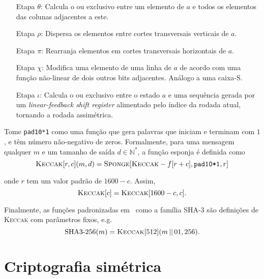 \documentclass[12pt]{report}
\newcommand{\concat}{\, \vert \vert \,}
\begin{document}
\begin{enumerate}

  \item[Etapa $\theta$:] Calcula o ou exclusivo entre um elemento de $a$ e
    todos os elementos das colunas adjacentes a este.

  \item[Etapa $\rho$:] Dispersa os elementos entre cortes transversais
    verticais de $a$.

  \item[Etapa $\pi$:] Rearranja elementos em cortes transversais horizontais de
    $a$.

  \item[Etapa $\chi$:] Modifica uma elemento de uma linha de $a$ de acordo com
    uma função não-linear de dois outros bits adjacentes. Análogo a uma caixa-S.

  \item[Etapa $\iota$:] Calcula o ou exclusivo entre o estado $a$ e uma
    sequência gerada por um \emph{linear-feedback shift register} alimentado
    pelo índice da rodada atual, tornando a rodada assimétrica.

\end{enumerate}

Tome \texttt{pad10*1} como uma função que gera palavras que iniciam e terminam
com $1$, e têm número não-negativo de zeros. Formalmente, para uma mensagem
qualquer $m$ e um tamanho de saída $d \in \mathbb{N}^{*}$, a função esponja é
definida como
\begin{equation}
  \textsc{Keccak}[r, c](m, d)
    = \textsc{Sponge}[\textsc{Keccak}-f[r + c], \texttt{pad10*1}, r]
\end{equation}

onde $r$ tem um valor padrão de $1600 - c$. Assim,
\begin{equation}
  \textsc{Keccak}[c] = \textsc{Keccak}[1600 - c, c].
\end{equation}

Finalmente, as funções padronizadas em~\cite{Dworkin2015} como a família SHA-3
são definições de \textsc{Keccak} com parâmetros fixos, e.g.
\begin{equation}
  \text{SHA3-}256(m) = \textsc{Keccak}[512](m \concat 01, 256).
\end{equation}

\section{Criptografia simétrica}
\end{document}
